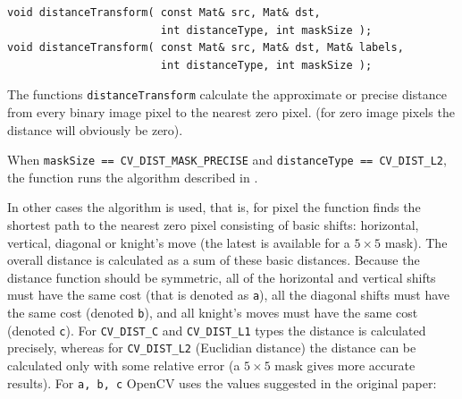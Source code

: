 \begin{lstlisting}
void distanceTransform( const Mat& src, Mat& dst,
                        int distanceType, int maskSize );
void distanceTransform( const Mat& src, Mat& dst, Mat& labels,
                        int distanceType, int maskSize );
\end{lstlisting}
\begin{description}
\end{description}

The functions \texttt{distanceTransform} calculate the approximate or precise
distance from every binary image pixel to the nearest zero pixel.
(for zero image pixels the distance will obviously be zero).

When \texttt{maskSize == CV\_DIST\_MASK\_PRECISE} and \texttt{distanceType == CV\_DIST\_L2}, the function runs the algorithm described in \cite{Felzenszwalb04}.

In other cases the \cite{Borgefors86} algorithm is used, that is,
for pixel the function finds the shortest path to the nearest zero pixel
consisting of basic shifts: horizontal,
vertical, diagonal or knight's move (the latest is available for a
$5\times 5$ mask). The overall distance is calculated as a sum of these
basic distances. Because the distance function should be symmetric,
all of the horizontal and vertical shifts must have the same cost (that
is denoted as \texttt{a}), all the diagonal shifts must have the
same cost (denoted \texttt{b}), and all knight's moves must have
the same cost (denoted \texttt{c}). For \texttt{CV\_DIST\_C} and
\texttt{CV\_DIST\_L1} types the distance is calculated precisely,
whereas for \texttt{CV\_DIST\_L2} (Euclidian distance) the distance
can be calculated only with some relative error (a $5\times 5$ mask
gives more accurate results). For \texttt{a, b, c}
OpenCV uses the values suggested in the original paper:

